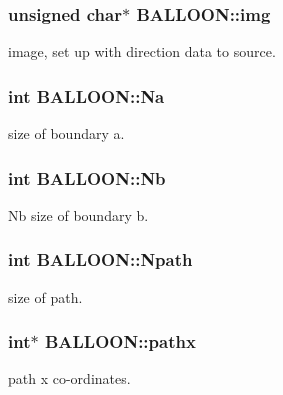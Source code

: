 \subsubsection[{\texorpdfstring{img}{img}}]{\setlength{\rightskip}{0pt plus 5cm}unsigned char$\ast$ B\+A\+L\+L\+O\+O\+N\+::img}\hypertarget{struct_b_a_l_l_o_o_n_ac46d50ca34550afcf41745e3a6b4945d}{}\label{struct_b_a_l_l_o_o_n_ac46d50ca34550afcf41745e3a6b4945d}
image, set up with direction data to source. 
\subsubsection[{\texorpdfstring{Na}{Na}}]{\setlength{\rightskip}{0pt plus 5cm}int B\+A\+L\+L\+O\+O\+N\+::\+Na}\hypertarget{struct_b_a_l_l_o_o_n_a76b75cde6c3eb4c4ce4c6dd65bb02b5a}{}\label{struct_b_a_l_l_o_o_n_a76b75cde6c3eb4c4ce4c6dd65bb02b5a}
size of boundary a. 
\subsubsection[{\texorpdfstring{Nb}{Nb}}]{\setlength{\rightskip}{0pt plus 5cm}int B\+A\+L\+L\+O\+O\+N\+::\+Nb}\hypertarget{struct_b_a_l_l_o_o_n_a85e567fb946d66b7253609afc8881f16}{}\label{struct_b_a_l_l_o_o_n_a85e567fb946d66b7253609afc8881f16}
Nb size of boundary b. 
\subsubsection[{\texorpdfstring{Npath}{Npath}}]{\setlength{\rightskip}{0pt plus 5cm}int B\+A\+L\+L\+O\+O\+N\+::\+Npath}\hypertarget{struct_b_a_l_l_o_o_n_ae1c9ea29b29e7aadaff70947a4d26a71}{}\label{struct_b_a_l_l_o_o_n_ae1c9ea29b29e7aadaff70947a4d26a71}
size of path. 
\subsubsection[{\texorpdfstring{pathx}{pathx}}]{\setlength{\rightskip}{0pt plus 5cm}int$\ast$ B\+A\+L\+L\+O\+O\+N\+::pathx}\hypertarget{struct_b_a_l_l_o_o_n_ac621abfcd3ff3f7723bdea2a27958373}{}\label{struct_b_a_l_l_o_o_n_ac621abfcd3ff3f7723bdea2a27958373}
path x co-\/ordinates. 
